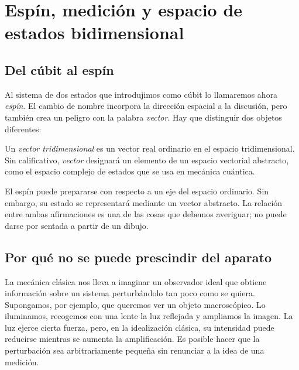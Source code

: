 \chapter{Espín, medición y espacio de estados bidimensional}


\section{Del cúbit al espín}

Al sistema de dos estados que introdujimos como cúbit lo llamaremos ahora \emph{espín}. El cambio de nombre incorpora la dirección espacial a la discusión, pero también crea un peligro con la palabra \emph{vector}. Hay que distinguir dos objetos diferentes:

\begin{definition}
Un \emph{vector tridimensional} es un vector real ordinario en el espacio tridimensional. Sin calificativo, \emph{vector} designará un elemento de un espacio vectorial abstracto, como el espacio complejo de estados que se usa en mecánica cuántica.
\end{definition}

El espín puede prepararse con respecto a un eje del espacio ordinario. Sin embargo, su estado se representará mediante un vector abstracto. La relación entre ambas afirmaciones es una de las cosas que debemos averiguar; no puede darse por sentada a partir de un dibujo.

\section{Por qué no se puede prescindir del aparato}

La mecánica clásica nos lleva a imaginar un observador ideal que obtiene información sobre un sistema perturbándolo tan poco como se quiera. Supongamos, por ejemplo, que queremos ver un objeto macroscópico. Lo iluminamos, recogemos con una lente la luz reflejada y ampliamos la imagen. La luz ejerce cierta fuerza, pero, en la idealización clásica, su intensidad puede reducirse mientras se aumenta la amplificación. Es posible hacer que la perturbación sea arbitrariamente pequeña sin renunciar a la idea de una medición.

